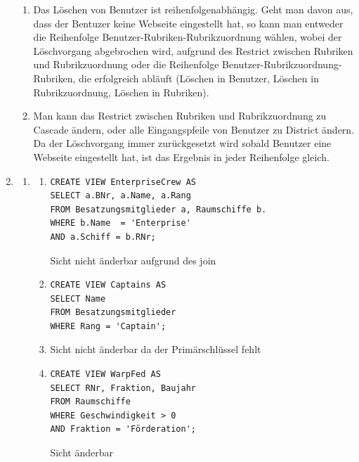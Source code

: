\documentclass{article}
\begin{document}
\begin{enumerate}
\begin{enumerate}
                \item
                    Das Löschen von Benutzer ist reihenfolgenabhängig. Geht man davon aus, dass der Bentuzer keine Webseite eingestellt hat, so kann man entweder die Reihenfolge Benutzer-Rubriken-Rubrikzuordnung wählen, wobei der Löschvorgang abgebrochen wird, aufgrund des Restrict zwischen Rubriken und Rubrikzuordnung oder die Reihenfolge Benutzer-Rubrikzuordnung-Rubriken, die erfolgreich abläuft (Löschen in Benutzer, Löschen in Rubrikzuordnung, Löschen in Rubriken).
                \item
                    Man kann das Restrict zwischen Rubriken und Rubrikzuordnung zu Cascade ändern, oder alle Eingangspfeile von Benutzer zu District ändern. Da der Löschvorgang immer zurückgesetzt wird sobald Benutzer eine Webseite eingestellt hat, ist das Ergebnis in jeder Reihenfolge gleich. 
            \end{enumerate}
        \item
            \begin{enumerate}
                \item 
                    \begin{enumerate}
                        \item 
                            \begin{verbatim}
CREATE VIEW EnterpriseCrew AS
SELECT a.BNr, a.Name, a.Rang 
FROM Besatzungsmitglieder a, Raumschiffe b.
WHERE b.Name  = 'Enterprise'
AND a.Schiff = b.RNr; 
                            \end{verbatim}
                            Sicht nicht änderbar aufgrund des join
                        \item
                            \begin{verbatim}
CREATE VIEW Captains AS
SELECT Name
FROM Besatzungsmitglieder   
WHERE Rang = 'Captain';
                            \end{verbatim}
                        \item 
                            Sicht nicht änderbar da der Primärschlüssel fehlt
                        \item
                            \begin{verbatim}
CREATE VIEW WarpFed AS
SELECT RNr, Fraktion, Baujahr
FROM Raumschiffe
WHERE Geschwindigkeit > 0
AND Fraktion = 'Förderation';
                            \end{verbatim}
                            Sicht änderbar
                    \end{enumerate}

\end{enumerate}
\end{enumerate}
\end{document}
